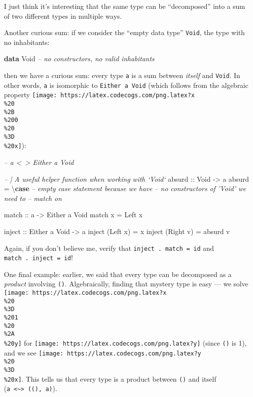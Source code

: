 \documentclass[]{article}
\newenvironment{Shaded}{}{}
\newcommand{\CommentTok}[1]{\textcolor[rgb]{0.38,0.63,0.69}{\textit{#1}}}
\newcommand{\DataTypeTok}[1]{\textcolor[rgb]{0.56,0.13,0.00}{#1}}
\newcommand{\FunctionTok}[1]{\textcolor[rgb]{0.02,0.16,0.49}{#1}}
\newcommand{\KeywordTok}[1]{\textcolor[rgb]{0.00,0.44,0.13}{\textbf{#1}}}
\newcommand{\NormalTok}[1]{#1}
\newcommand{\OtherTok}[1]{\textcolor[rgb]{0.00,0.44,0.13}{#1}}
\begin{document}
I just think it's interesting that the same type can be ``decomposed'' into a
sum of two different types in multiple ways.

Another curious sum: if we consider the ``empty data type'' \texttt{Void}, the
type with no inhabitants:

\begin{Shaded}
\begin{Highlighting}[]
\KeywordTok{data} \DataTypeTok{Void}           \CommentTok{-- no constructors, no valid inhabitants}
\end{Highlighting}
\end{Shaded}

then we have a curious sum: every type \texttt{a} is a sum between \emph{itself}
and \texttt{Void}. In other words, \texttt{a} is isomorphic to
\texttt{Either\ a\ Void} (which follows from the algebraic property
\texttt{[image: https://latex.codecogs.com/png.latex?x\\\%20\\\%2B\\\%200\\\%20\\\%3D\\\%20x]}):

\begin{Shaded}
\begin{Highlighting}[]
\CommentTok{-- a <~> Either a Void}

\CommentTok{-- | A useful helper function when working with `Void`}
\OtherTok{absurd ::} \DataTypeTok{Void} \OtherTok{->}\NormalTok{ a}
\NormalTok{absurd }\FunctionTok{=}\NormalTok{ \textbackslash{}}\KeywordTok{case} \CommentTok{-- empty case statement because we have}
               \CommentTok{-- no constructors of 'Void' we need to}
               \CommentTok{-- match on}

\OtherTok{match ::}\NormalTok{ a }\OtherTok{->} \DataTypeTok{Either}\NormalTok{ a }\DataTypeTok{Void}
\NormalTok{match x }\FunctionTok{=} \DataTypeTok{Left}\NormalTok{ x}

\OtherTok{inject ::} \DataTypeTok{Either}\NormalTok{ a }\DataTypeTok{Void} \OtherTok{->}\NormalTok{ a}
\NormalTok{inject (}\DataTypeTok{Left}\NormalTok{  x) }\FunctionTok{=}\NormalTok{ x}
\NormalTok{inject (}\DataTypeTok{Right}\NormalTok{ v) }\FunctionTok{=}\NormalTok{ absurd v}
\end{Highlighting}
\end{Shaded}

Again, if you don't believe me, verify that \texttt{inject\ .\ match\ =\ id} and
\texttt{match\ .\ inject\ =\ id}!

One final example: earlier, we said that every type can be decomposed as a
\emph{product} involving \texttt{()}. Algebraically, finding that mystery type
is easy --- we solve
\texttt{[image: https://latex.codecogs.com/png.latex?x\\\%20\\\%3D\\\%201\\\%20\\\%2A\\\%20y]}
for \texttt{[image: https://latex.codecogs.com/png.latex?y]} (since \texttt{()}
is 1), and we see
\texttt{[image: https://latex.codecogs.com/png.latex?y\\\%20\\\%3D\\\%20x]}. This
tells us that every type is a product between \texttt{()} and itself
(\texttt{a\ \textless{}\textasciitilde{}\textgreater{}\ ((),\ a)}).
\end{document}
